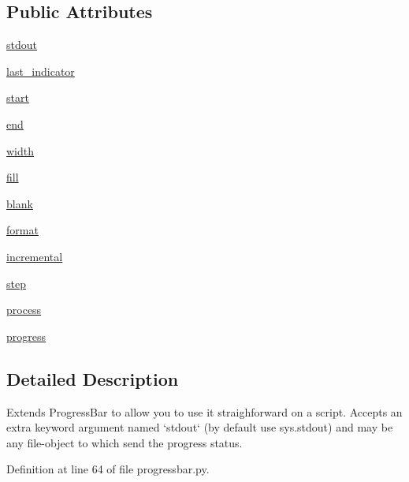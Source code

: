 \subsection*{Public Attributes}
\begin{DoxyCompactItemize}
\item 
\hyperlink{classprogressbar_1_1AnimatedProgressBar_aa8ec5cac3f292b0b44d19338467793ae}{stdout}
\item 
\hyperlink{classprogressbar_1_1AnimatedProgressBar_abf3134500836a929ae445ecc9195ecde}{last\_\-indicator}
\item 
\hyperlink{classprogressbar_1_1ProgressBar_afa2d297abaa373dfe45a2036b0d3c123}{start}
\item 
\hyperlink{classprogressbar_1_1ProgressBar_a46470a910a06dc2328d74c9da269f800}{end}
\item 
\hyperlink{classprogressbar_1_1ProgressBar_a818a39d7acf131db44f1ce01c3a1ea98}{width}
\item 
\hyperlink{classprogressbar_1_1ProgressBar_a6688b4a5e97312c48e61f7e3f96eeca0}{fill}
\item 
\hyperlink{classprogressbar_1_1ProgressBar_adb0492e85eacafa26a86c115791e5708}{blank}
\item 
\hyperlink{classprogressbar_1_1ProgressBar_a7c67be1a98afb82bcbc6ddf97d632662}{format}
\item 
\hyperlink{classprogressbar_1_1ProgressBar_aedc9b9f8823b12386c934d1427c35e0a}{incremental}
\item 
\hyperlink{classprogressbar_1_1ProgressBar_a96358aecb3816a174bae4795122f5c1b}{step}
\item 
\hyperlink{classprogressbar_1_1ProgressBar_a9a097a5d47063a94117196891ac4b666}{process}
\item 
\hyperlink{classprogressbar_1_1ProgressBar_abec1e1566520ec7ea9522f56dccaa125}{progress}
\end{DoxyCompactItemize}


\subsection{Detailed Description}
\begin{DoxyVerb}Extends ProgressBar to allow you to use it straighforward on a script.
Accepts an extra keyword argument named `stdout` (by default use sys.stdout)
and may be any file-object to which send the progress status.
\end{DoxyVerb}
 

Definition at line 64 of file progressbar.py.

